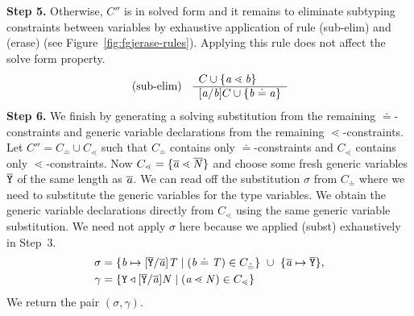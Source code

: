 \textbf{Step 5.} Otherwise, $C''$ is in solved form and it remains to eliminate subtyping constraints between variables by exhaustive application of rule
(sub-elim) and (erase) (see Figure~\ref{fig:fgjerase-rules}). Applying this rule does not affect the solve form property.
\begin{gather*}
  \begin{array}[c]{lll}
    \text{(sub-elim)} &
                     \begin{array}[c]{l}
                       C \cup \{ \mathit{ a } \lessdot \mathit{ b } \}\\
                       \hline
                       [\mathit{ a }/\mathit{ b }]C \cup \{ \mathit{ b } \doteq \mathit{ a } \}
                     \end{array}
  \end{array}
\end{gather*}
\textbf{Step 6.} We finish by generating a solving substitution from the remaining $\doteq$-constraints
and generic variable declarations from the remaining $\lessdot$-constraints. Let $C'' = C_{\doteq} \cup C_{\lessdot}$ such that $C_{\doteq}$
contains only $\doteq$-constraints and $C_{\lessdot}$ contains only $\lessdot$-constraints. Now $C_{\lessdot} = \{  \overline{\mathit{\mathit{ a }}} \lessdot
  \overline{\mathit{N}} \}$ and choose some fresh generic variables $\overline{\tt Y}$ of the same length as $\overline{\mathit{\mathit{ a }}}$. We can read off the substitution $\sigma$
from $C_{\doteq}$ where we need to substitute the generic variables for the type variables. We obtain the generic variable declarations
directly from $C_{\lessdot}$ using the same generic variable substitution. We need not apply $\sigma$ here because
we applied (subst) exhaustively in Step~3.
\begin{align*}
  \sigma &=
           \set{\tv{b} \mapsto [\ol{Y}/\ol{\tv{a}}]\itype{T} \mid (\tv{b} \doteq \itype{T}) \in C_{\doteq}} \ \cup \ 
           \set{\il{\tv{a}} \mapsto \ol{Y} }, \\
  \unifyGenerics{} & =
                     \set{\type{Y} \triangleleft [\ol{Y}/\ol{\tv{a}}]\itype{N} \mid (\tv{a} \lessdot \itype{N}) \in C_{\lessdot}}
\end{align*}
We return the pair $(\sigma, \gamma)$.


